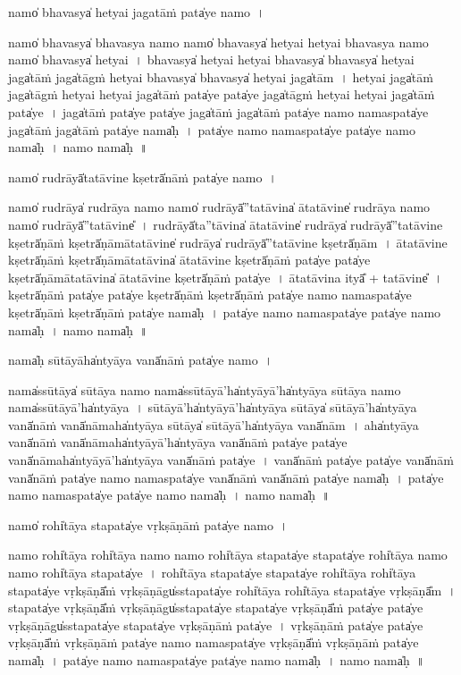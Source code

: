 \documentclass[parskip, DIV=14]{scrartcl}
\begin{document}
{\vspace{0.5cm}
namo̍ bha॒vasya̍ he॒tyai jagatā॒ṁ pata̍ye॒ namo॒~।

namo̍ bha॒vasya̍ bha॒vasya॒ namo॒ namo̍ bha॒vasya̍ he॒tyai he॒tyai bha॒vasya॒ namo॒ namo̍ bha॒vasya̍ he॒tyai~।
bha॒vasya̍ he॒tyai he॒tyai bha॒vasya̍ bha॒vasya̍ he॒tyai jaga̍tā॒ṁ jaga̍tāgṁ he॒tyai bha॒vasya̍ bha॒vasya̍ he॒tyai jaga̍tām~।
he॒tyai jaga̍tā॒ṁ jaga̍tāgṁ he॒tyai he॒tyai jaga̍tā॒ṁ pata̍ye॒ pata̍ye॒ jaga̍tāgṁ he॒tyai he॒tyai jaga̍tā॒ṁ pata̍ye~।
jaga̍tā॒ṁ pata̍ye॒ pata̍ye॒ jaga̍tā॒ṁ jaga̍tā॒ṁ pata̍ye namo॒ nama॒spata̍ye॒ jaga̍tā॒ṁ jaga̍tā॒ṁ pata̍ye nama̍ḥ~।
pata̍ye॒ namo॒ nama॒spata̍ye॒ pata̍ye॒ namo॒ nama̍ḥ~।
namo॒ nama̍ḥ~॥ 

\vspace{0.5cm}
namo̍  ru॒drāyā̍tatā॒vine॒ kṣetrā̍nā॒ṁ pata̍ye॒ namo॒~।

namo̍  ru॒drāya̍  ru॒drāya॒ namo॒ namo̍ ru॒drāyā̍''tatā॒vina̍ ātatā॒vine̍ ru॒drāya॒ namo॒ namo̍  ru॒drāyā̍''tatā॒vine̎~।
ru॒drāyā̍ta''tā॒vina̍ ātatā॒vine̍ ru॒drāya̍ ru॒drāyā̍''tatā॒vine॒ kṣetrā̍ṇā॒ṁ kṣetrā̍ṇāmātatā॒vine̍ ru॒drāya̍ ru॒drāyā̍''tatā॒vine॒ kṣetrā̍ṇām~।
ā॒ta॒tā॒vine॒ kṣetrā̍ṇā॒ṁ kṣetrā̍ṇāmātatā॒vina̍ ātatā॒vine॒ kṣetrā̍ṇā॒ṁ pata̍ye॒ pata̍ye॒ kṣetrā̍ṇāmātatā॒vina̍ ātatā॒vine॒ kṣetrā̍ṇā॒ṁ pata̍ye~।
ā॒ta॒tā॒vina॒ ityā̎ + tatā॒vine̎~।
kṣetrā̍ṇā॒ṁ pata̍ye॒ pata̍ye॒ kṣetrā̍ṇā॒ṁ kṣetrā̍ṇā॒ṁ pata̍ye॒ namo॒ nama॒spata̍ye॒ kṣetrā̍ṇā॒ṁ kṣetrā̍ṇā॒ṁ pata̍ye॒ nama̍ḥ~।
pata̍ye॒ namo॒ nama॒spata̍ye॒ pata̍ye॒ namo॒ nama̍ḥ~।
namo॒ nama̍ḥ~॥ 

\vspace{0.5cm}
nama̍ḥ sū॒tāyāha̍ntyāya॒ vanā̍nā॒ṁ pata̍ye॒ namo॒~।

nama̍ssū॒tāya̍ sū॒tāya॒ namo॒ nama̍ssū॒tāyā'ha̍ntyā॒yā'ha̍ntyāya sū॒tāya॒ namo॒ nama̍ssū॒tāyā'ha̍ntyāya~।
sū॒tāyā'ha̍ntyā॒yā'ha̍ntyāya sū॒tāya̍ sū॒tāyā'ha̍ntyāya॒ vanā̍nā॒ṁ vanā̍nā॒maha̍ntyāya sū॒tāya̍ sū॒tāyā'ha̍ntyāya॒ vanā̍nām~।
aha̍ntyāya॒ vanā̍nā॒ṁ vanā̍nā॒maha̍ntyā॒yā'ha̍ntyāya॒ vanā̍nā॒ṁ pata̍ye॒ pata̍ye॒ vanā̍nā॒maha̍ntyā॒yā'ha̍ntyāya॒ vanā̍nā॒ṁ pata̍ye~।
vanā̍nā॒ṁ pata̍ye॒ pata̍ye॒ vanā̍nā॒ṁ vanā̍nā॒ṁ pata̍ye॒ namo॒ nama॒spata̍ye॒ vanā̍nā॒ṁ vanā̍nā॒ṁ pata̍ye॒ nama̍ḥ~।
pata̍ye॒ namo॒ nama॒spata̍ye॒ pata̍ye॒ namo॒ nama̍ḥ~।
namo॒ nama̍ḥ~॥ 

\vspace{0.5cm}
namo̍ rohi̍tāya sta॒pata̍ye vṛ॒kṣāṇā॒ṁ  pata̍ye॒ namo॒~।

namo॒ rohi̍tāya॒ rohi̍tāya॒ namo॒ namo॒ rohi̍tāya sta॒pata̍ye sta॒pata̍ye॒ rohi̍tāya॒ namo॒ namo॒ rohi̍tāya sta॒pata̍ye~।
rohi̍tāya sta॒pata̍ye sta॒pata̍ye॒ rohi̍tāya॒ rohi̍tāya sta॒pata̍ye vṛ॒kṣāṇā̎ṁ vṛ॒kṣāṇāgu̍ssta॒pata̍ye॒ rohi̍tāya॒ rohi̍tāya sta॒pata̍ye vṛ॒kṣāṇā̎m~।
sta॒pata̍ye vṛ॒kṣāṇā̎ṁ vṛ॒kṣāṇāgu̍ssta॒pata̍ye sta॒pata̍ye vṛ॒kṣāṇā̎ṁ pata̍ye॒ pata̍ye vṛ॒kṣāṇāgu̍ssta॒pata̍ye sta॒pata̍ye vṛ॒kṣāṇā॒ṁ pata̍ye~।
vṛ॒kṣāṇā॒ṁ pata̍ye॒ pata̍ye vṛ॒kṣāṇā̎ṁ vṛ॒kṣāṇā॒ṁ pata̍ye॒ namo॒ nama॒spata̍ye vṛ॒kṣāṇā̎ṁ vṛ॒kṣāṇā॒ṁ pata̍ye॒ nama̍ḥ~।
pata̍ye॒ namo॒ nama॒spata̍ye॒ pata̍ye॒ namo॒ nama̍ḥ~।
namo॒ nama̍ḥ~॥ 

}
\end{document}
